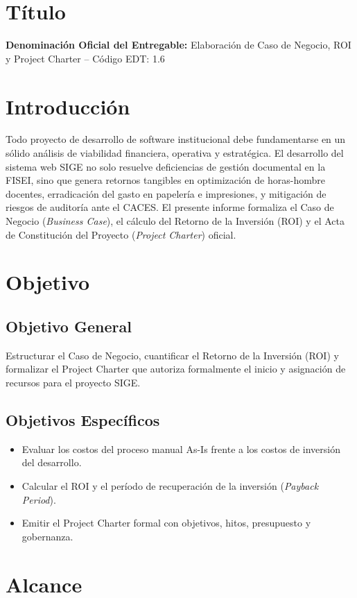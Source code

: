 \documentclass[12pt,a4paper]{article}
\begin{document}
\section{Título}
\textbf{Denominación Oficial del Entregable:} Elaboración de Caso de Negocio, ROI y Project Charter -- Código EDT: 1.6

\section{Introducción}
Todo proyecto de desarrollo de software institucional debe fundamentarse en un sólido análisis de viabilidad financiera, operativa y estratégica. El desarrollo del sistema web SIGE no solo resuelve deficiencias de gestión documental en la FISEI, sino que genera retornos tangibles en optimización de horas-hombre docentes, erradicación del gasto en papelería e impresiones, y mitigación de riesgos de auditoría ante el CACES. El presente informe formaliza el Caso de Negocio (\textit{Business Case}), el cálculo del Retorno de la Inversión (ROI) y el Acta de Constitución del Proyecto (\textit{Project Charter}) oficial.

\section{Objetivo}
\subsection{Objetivo General}
Estructurar el Caso de Negocio, cuantificar el Retorno de la Inversión (ROI) y formalizar el Project Charter que autoriza formalmente el inicio y asignación de recursos para el proyecto SIGE.
\subsection{Objetivos Específicos}
\begin{itemize}[leftmargin=1.5em, itemsep=2pt]
    \item Evaluar los costos del proceso manual As-Is frente a los costos de inversión del desarrollo.
    \item Calcular el ROI y el período de recuperación de la inversión (\textit{Payback Period}).
    \item Emitir el Project Charter formal con objetivos, hitos, presupuesto y gobernanza.
\end{itemize}

\section{Alcance}
\end{document}
